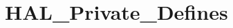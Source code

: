 \hypertarget{group___h_a_l___private___defines}{}\section{H\+A\+L\+\_\+\+Private\+\_\+\+Defines}
\label{group___h_a_l___private___defines}
